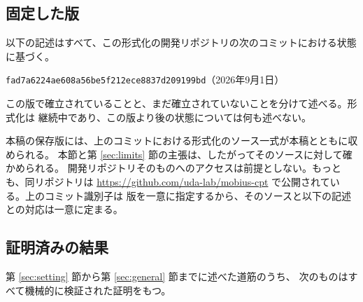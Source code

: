 \documentclass[11pt,a4paper]{article}
\newcommand{\pinnedcommit}{fad7a6224ae608a56be5f212ece8837d209199bd}
\newcommand{\pinneddate}{2026年9月1日}
\theoremstyle{definition}
\begin{document}
\subsection{固定した版}
\label{sec:pinned}

以下の記述はすべて、この形式化の開発リポジトリの次のコミットにおける状態に基づく。

\begin{center}
\texttt{\pinnedcommit}\qquad（\pinneddate）
\end{center}

\noindent
この版で確立されていることと、まだ確立されていないことを分けて述べる。形式化は
継続中であり、この版より後の状態については何も述べない。

本稿の保存版には、上のコミットにおける形式化のソース一式が本稿とともに収められる。
本節と第 \ref{sec:limits} 節の主張は、したがってそのソースに対して確かめられる。
開発リポジトリそのものへのアクセスは前提としない。もっとも、同リポジトリは
\url{https://github.com/uda-lab/mobius-cpt} で公開されている。上のコミット識別子は
版を一意に指定するから、そのソースと以下の記述との対応は一意に定まる。

\subsection{証明済みの結果}
\label{sec:proved}

第 \ref{sec:setting} 節から第 \ref{sec:general} 節までに述べた道筋のうち、
次のものはすべて機械的に検証された証明をもつ。
\end{document}
